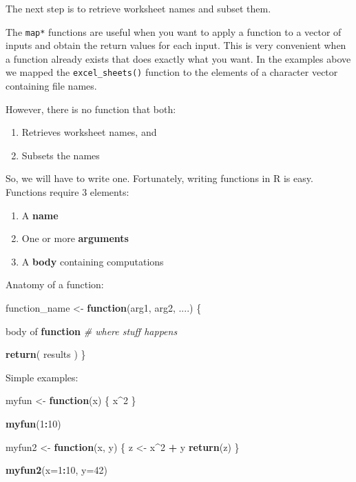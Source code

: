 \documentclass[]{book}
\newenvironment{Shaded}{\begin{snugshade}}{\end{snugshade}}
\newcommand{\KeywordTok}[1]{\textcolor[rgb]{0.13,0.29,0.53}{\textbf{#1}}}
\newcommand{\DataTypeTok}[1]{\textcolor[rgb]{0.13,0.29,0.53}{#1}}
\newcommand{\DecValTok}[1]{\textcolor[rgb]{0.00,0.00,0.81}{#1}}
\newcommand{\StringTok}[1]{\textcolor[rgb]{0.31,0.60,0.02}{#1}}
\newcommand{\CommentTok}[1]{\textcolor[rgb]{0.56,0.35,0.01}{\textit{#1}}}
\newcommand{\ControlFlowTok}[1]{\textcolor[rgb]{0.13,0.29,0.53}{\textbf{#1}}}
\newcommand{\OperatorTok}[1]{\textcolor[rgb]{0.81,0.36,0.00}{\textbf{#1}}}
\newcommand{\NormalTok}[1]{#1}
\providecommand{\tightlist}{%
  \setlength{\itemsep}{0pt}\setlength{\parskip}{0pt}}
\begin{document}
The next step is to retrieve worksheet names and subset them.

The \texttt{map*} functions are useful when you want to apply a function
to a vector of inputs and obtain the return values for each input. This
is very convenient when a function already exists that does exactly what
you want. In the examples above we mapped the \texttt{excel\_sheets()}
function to the elements of a character vector containing file names.

However, there is no function that both:

\begin{enumerate}
\def\labelenumi{\arabic{enumi}.}
\tightlist
\item
  Retrieves worksheet names, and
\item
  Subsets the names
\end{enumerate}

So, we will have to write one. Fortunately, writing functions in R is
easy. Functions require 3 elements:

\begin{enumerate}
\def\labelenumi{\arabic{enumi}.}
\tightlist
\item
  A \textbf{name}
\item
  One or more \textbf{arguments}
\item
  A \textbf{body} containing computations
\end{enumerate}

Anatomy of a function:

\begin{Shaded}
\begin{Highlighting}[]
\NormalTok{function_name <-}\StringTok{ }\ControlFlowTok{function}\NormalTok{(arg1, arg2, ....) \{}
  
\NormalTok{    body of }\ControlFlowTok{function} \CommentTok{# where stuff happens }

    \KeywordTok{return}\NormalTok{( results ) }
\NormalTok{\}}
\end{Highlighting}
\end{Shaded}

Simple examples:

\begin{Shaded}
\begin{Highlighting}[]
\NormalTok{myfun <-}\StringTok{ }\ControlFlowTok{function}\NormalTok{(x) \{}
\NormalTok{  x}\OperatorTok{^}\DecValTok{2}
\NormalTok{\}}

\KeywordTok{myfun}\NormalTok{(}\DecValTok{1}\OperatorTok{:}\DecValTok{10}\NormalTok{)}

\NormalTok{myfun2 <-}\StringTok{ }\ControlFlowTok{function}\NormalTok{(x, y) \{}
\NormalTok{  z <-}\StringTok{ }\NormalTok{x}\OperatorTok{^}\DecValTok{2} \OperatorTok{+}\StringTok{ }\NormalTok{y}
  \KeywordTok{return}\NormalTok{(z)}
\NormalTok{\}}

\KeywordTok{myfun2}\NormalTok{(}\DataTypeTok{x=}\DecValTok{1}\OperatorTok{:}\DecValTok{10}\NormalTok{, }\DataTypeTok{y=}\DecValTok{42}\NormalTok{)}
\end{Highlighting}
\end{Shaded}
\end{document}
